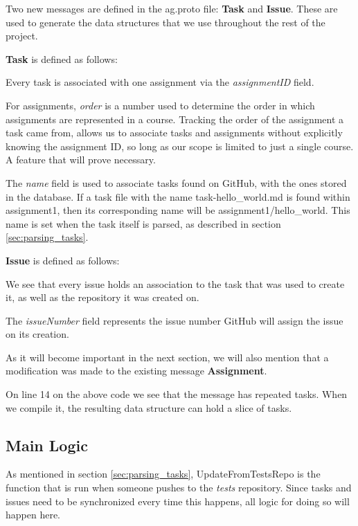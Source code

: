 Two new messages are defined in the ag.proto file: \textbf{Task} and \textbf{Issue}.
These are used to generate the data structures that we use throughout the rest of the project.

\textbf{Task} is defined as follows:



Every task is associated with one assignment via the \textit{assignmentID} field.

For assignments, \textit{order} is a number used to determine the order in which assignments are represented in a course.
Tracking the order of the assignment a task came from, allows us to associate tasks and assignments without explicitly knowing the assignment ID, so long as our scope is limited to just a single course.
A feature that will prove necessary.

The \textit{name} field is used to associate tasks found on GitHub, with the ones stored in the database.
If a task file with the name task-hello\_world.md is found within assignment1, then its corresponding name will be assignment1/hello\_world.
This name is set when the task itself is parsed, as described in section \ref{sec:parsing_tasks}.

\textbf{Issue} is defined as follows:



We see that every issue holds an association to the task that was used to create it, as well as the repository it was created on.

The \textit{issueNumber} field represents the issue number GitHub will assign the issue on its creation.

As it will become important in the next section, we will also mention that a modification was made to the existing message \textbf{Assignment}.



On line 14 on the above code we see that the message has repeated tasks.
When we compile it, the resulting data structure can hold a slice of tasks.

\subsection{Main Logic}

As mentioned in section \ref{sec:parsing_tasks}, UpdateFromTestsRepo is the function that is run when someone pushes to the \textit{tests} repository.
Since tasks and issues need to be synchronized every time this happens, all logic for doing so will happen here.

